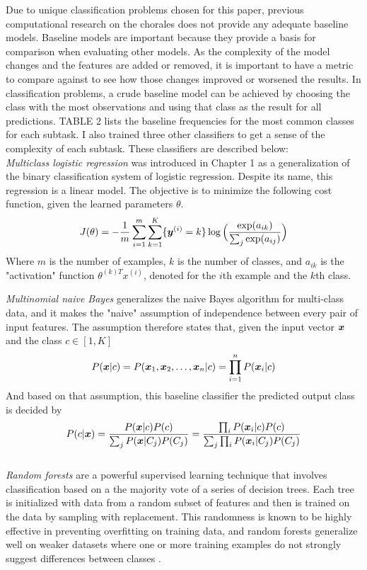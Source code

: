 \documentclass[11pt]{article}
\begin{document}
Due to unique classification problems chosen for this paper, previous computational research on the chorales does not provide any adequate baseline models. Baseline models are important because they provide a basis for comparison when evaluating other models. As the complexity of the model changes and the features are added or removed, it is important to have a metric to compare against to see how those changes improved or worsened the results. In classification problems, a crude baseline model can be achieved by choosing the class with the most observations and using that class as the result for all predictions. TABLE 2 lists the baseline frequencies for the most common classes for each subtask. I also trained three other classifiers to get a sense of the complexity of each subtask. These classifiers are described below: \\
\textit{Multiclass logistic regression} was introduced in Chapter 1 as a generalization of the binary classification system of logistic regression. Despite its name, this regression is a linear model. The objective is to minimize the following cost function, given the learned parameters $\theta$.
$$ J(\theta) = -\frac{1}{m} \sum_{i = 1}^{m} \sum_{k  = 1}^{K} \{ \boldsymbol{y}^{(i)} = k \} \log \Big( \frac{ \exp(a_{ik}) } { \sum_j \exp(a_{ij}) } \Big) $$
Where $m$ is the number of examples, $k$ is the number of classes, and $a_{ik}$ is the "activation" function $\theta^{(k)T} x^{(i)}$, denoted for the $i$th example and the $k$th class.

\textit{Multinomial naive Bayes} generalizes the naive Bayes algorithm for multi-class data, and it makes the "naive" assumption of independence between every pair of input features. The assumption therefore states that, given the input vector $\boldsymbol{x}$ and the class $c \in [1, K]$
$$P(\boldsymbol{x} | c) = P(\boldsymbol{x}_1, \boldsymbol{x}_2, \ldots, \boldsymbol{x}_n | c) = \prod_{i=1}^{n} P(\boldsymbol{x}_i | c)$$
And based on that assumption, this baseline classifier the predicted output class is decided by
$$P(c | \boldsymbol{x}) = \frac{ P(\boldsymbol{x} | c) P(c) }{ \sum_j P(\boldsymbol{x} | C_j) P(C_j) } = \frac{ \prod_i P(\boldsymbol{x}_i | c) P(c) }{ \sum_j \prod_i P(\boldsymbol{x}_i | C_j) P(C_j) }$$\\

\textit{Random forests} are a powerful supervised learning technique that involves classification based on a the majority vote of a series of decision trees. Each tree is initialized with data from a random subset of features and then is trained on the data by sampling with replacement. This randomness is known to be highly effective in preventing overfitting on training data, and random forests generalize well on weaker datasets where one or more training examples do not strongly suggest differences between classes \citep[p.~18]{breiman2001}.
\end{document}
